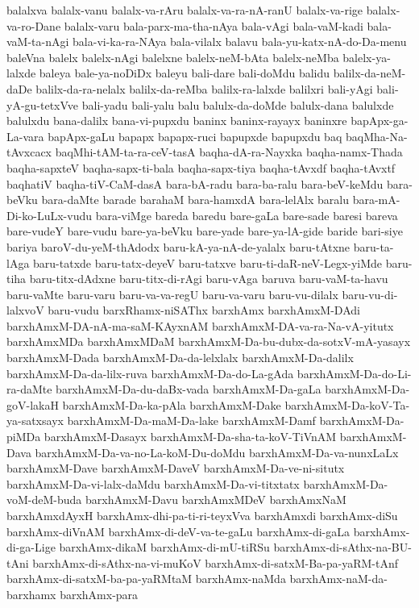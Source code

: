 {balalxva
balalx-vanu
balalx-va-rAru
balalx-va-ra-nA-ranU
balalx-va-rige
balalx-va-ro-Dane
balalx-varu
bala-parx-ma-tha-nAya
bala-vAgi
bala-vaM-kadi
bala-vaM-ta-nAgi
bala-vi-ka-ra-NAya
bala-vilalx
balavu
bala-yu-katx-nA-do-Da-menu
baleVna
balelx
balelx-nAgi
balelxne
balelx-neM-bAta
balelx-neMba
balelx-ya-lalxde
baleya
bale-ya-noDiDx
baleyu
bali-dare
bali-doMdu
balidu
balilx-da-neM-daDe
balilx-da-ra-nelalx
balilx-da-reMba
balilx-ra-lalxde
balilxri
bali-yAgi
bali-yA-gu-tetxVve
bali-yadu
bali-yalu
balu
balulx-da-doMde
balulx-dana
balulxde
balulxdu
bana-dalilx
bana-vi-pupxdu
baninx
baninx-rayayx
baninxre
bapApx-ga-La-vara
bapApx-gaLu
bapapx
bapapx-ruci
bapupxde
bapupxdu
baq
baqMha-Na-tAvxcacx
baqMhi-tAM-ta-ra-ceV-tasA
baqha-dA-ra-Nayxka
baqha-namx-Thada
baqha-sapxteV
baqha-sapx-ti-bala
baqha-sapx-tiya
baqha-tAvxdf
baqha-tAvxtf
baqhatiV
baqha-tiV-CaM-dasA
bara-bA-radu
bara-ba-ralu
bara-beV-keMdu
bara-beVku
bara-daMte
barade
barahaM
bara-hamxdA
bara-lelAlx
baralu
bara-mA-Di-ko-LuLx-vudu
bara-viMge
bareda
baredu
bare-gaLa
bare-sade
baresi
bareva
bare-vudeY
bare-vudu
bare-ya-beVku
bare-yade
bare-ya-lA-gide
baride
bari-siye
bariya
baroV-du-yeM-thAdodx
baru-kA-ya-nA-de-yalalx
baru-tAtxne
baru-ta-lAga
baru-tatxde
baru-tatx-deyeV
baru-tatxve
baru-ti-daR-neV-Legx-yiMde
baru-tiha
baru-titx-dAdxne
baru-titx-di-rAgi
baru-vAga
baruva
baru-vaM-ta-havu
baru-vaMte
baru-varu
baru-va-va-regU
baru-va-varu
baru-vu-dilalx
baru-vu-di-lalxvoV
baru-vudu
barxRhamx-niSAThx
barxhAmx
barxhAmxM-DAdi
barxhAmxM-DA-nA-ma-saM-KAyxnAM
barxhAmxM-DA-va-ra-Na-vA-yitutx
barxhAmxMDa
barxhAmxMDaM
barxhAmxM-Da-bu-dubx-da-sotxV-mA-yasayx
barxhAmxM-Dada
barxhAmxM-Da-da-lelxlalx
barxhAmxM-Da-dalilx
barxhAmxM-Da-da-lilx-ruva
barxhAmxM-Da-do-La-gAda
barxhAmxM-Da-do-Li-ra-daMte
barxhAmxM-Da-du-daBx-vada
barxhAmxM-Da-gaLa
barxhAmxM-Da-goV-lakaH
barxhAmxM-Da-ka-pAla
barxhAmxM-Dake
barxhAmxM-Da-koV-Ta-ya-satxsayx
barxhAmxM-Da-maM-Da-lake
barxhAmxM-Damf
barxhAmxM-Da-piMDa
barxhAmxM-Dasayx
barxhAmxM-Da-sha-ta-koV-TiVnAM
barxhAmxM-Dava
barxhAmxM-Da-va-no-La-koM-Du-doMdu
barxhAmxM-Da-va-nunxLaLx
barxhAmxM-Dave
barxhAmxM-DaveV
barxhAmxM-Da-ve-ni-situtx
barxhAmxM-Da-vi-lalx-daMdu
barxhAmxM-Da-vi-titxtatx
barxhAmxM-Da-voM-deM-buda
barxhAmxM-Davu
barxhAmxMDeV
barxhAmxNaM
barxhAmxdAyxH
barxhAmx-dhi-pa-ti-ri-teyxVva
barxhAmxdi
barxhAmx-diSu
barxhAmx-diVnAM
barxhAmx-di-deV-va-te-gaLu
barxhAmx-di-gaLa
barxhAmx-di-ga-Lige
barxhAmx-dikaM
barxhAmx-di-mU-tiRSu
barxhAmx-di-sAthx-na-BU-tAni
barxhAmx-di-sAthx-na-vi-muKoV
barxhAmx-di-satxM-Ba-pa-yaRM-tAnf
barxhAmx-di-satxM-ba-pa-yaRMtaM
barxhAmx-naMda
barxhAmx-naM-da-barxhamx
barxhAmx-para
}
